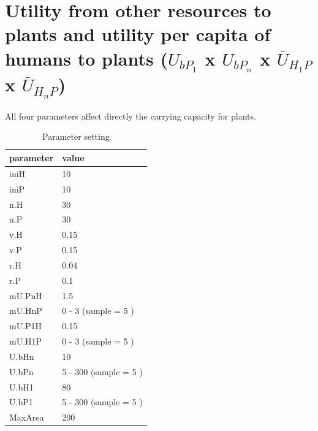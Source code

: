 \documentclass[
]{book}
\begin{document}
\newpage

\hypertarget{utility-from-other-resources-to-plants-and-utility-per-capita-of-humans-to-plants-u_bp_1-x-u_bp_n-x-baru_h_1p-x-baru_h_np}{%
\section{\texorpdfstring{Utility from other resources to plants and utility per capita of humans to plants (\(U_{bP_{1}}\) x \(U_{bP_{n}}\) x \(\bar{U}_{H_{1}P}\) x \(\bar{U}_{H_{n}P}\))}{Utility from other resources to plants and utility per capita of humans to plants (U\_\{bP\_\{1\}\} x U\_\{bP\_\{n\}\} x \textbackslash bar\{U\}\_\{H\_\{1\}P\} x \textbackslash bar\{U\}\_\{H\_\{n\}P\})}}\label{utility-from-other-resources-to-plants-and-utility-per-capita-of-humans-to-plants-u_bp_1-x-u_bp_n-x-baru_h_1p-x-baru_h_np}}


All four parameters affect directly the carrying capacity for plants.

\begin{table}[!h]

\caption{\label{tab:4UbPUHPtablepdf}Parameter setting}
\centering
\begin{tabular}[t]{l|l}
\hline
parameter & value\\
\hline
iniH & 10\\
\hline
iniP & 10\\
\hline
n.H & 30\\
\hline
n.P & 30\\
\hline
v.H & 0.15\\
\hline
v.P & 0.15\\
\hline
r.H & 0.04\\
\hline
r.P & 0.1\\
\hline
mU.PnH & 1.5\\
\hline
mU.HnP & 0 - 3 (sample = 5 )\\
\hline
mU.P1H & 0.15\\
\hline
mU.H1P & 0 - 3 (sample = 5 )\\
\hline
U.bHn & 10\\
\hline
U.bPn & 5 - 300 (sample = 5 )\\
\hline
U.bH1 & 80\\
\hline
U.bP1 & 5 - 300 (sample = 5 )\\
\hline
MaxArea & 200\\
\hline
\end{tabular}
\end{table}
\end{document}
